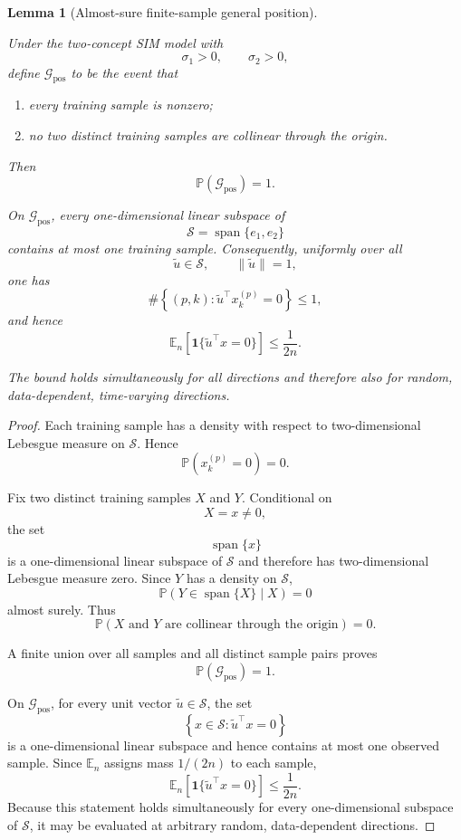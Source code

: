 \documentclass{article} %
\theoremstyle{plain}
\newtheorem{lemma}[theorem]{Lemma}
\theoremstyle{definition}
\theoremstyle{remark}
\begin{document}
\begin{lemma}[Almost-sure finite-sample general position]
\label{lem:general-position}

Under the two-concept SIM model with
\[
\sigma_1>0,
\qquad
\sigma_2>0,
\]
define $\mathcal G_{\mathrm{pos}}$ to be the event that

\begin{enumerate}[label=(\roman*),leftmargin=2em]
\item every training sample is nonzero;
\item no two distinct training samples are collinear through the origin.
\end{enumerate}

Then
\[
\boxed{
\mathbb P(\mathcal G_{\mathrm{pos}})=1.
}
\]

On $\mathcal G_{\mathrm{pos}}$, every one-dimensional linear subspace of
\[
\mathcal S=\operatorname{span}\{e_1,e_2\}
\]
contains at most one training sample. Consequently, uniformly over all
\[
\widetilde u\in\mathcal S,
\qquad
\|\widetilde u\|=1,
\]
one has
\[
\#\left\{
(p,k):
\widetilde u^\top x_k^{(p)}=0
\right\}
\le1,
\]
and hence
\[
\boxed{
\mathbb E_n
\left[
\mathbf 1
\{
\widetilde u^\top x=0
\}
\right]
\le
\frac1{2n}.
}
\]

The bound holds simultaneously for all directions and therefore also for
random, data-dependent, time-varying directions.
\end{lemma}

\begin{proof}
Each training sample has a density with respect to two-dimensional Lebesgue
measure on $\mathcal S$. Hence
\[
\mathbb P
\left(
x_k^{(p)}=0
\right)
=
0.
\]

Fix two distinct training samples $X$ and $Y$. Conditional on
\[
X=x\neq0,
\]
the set
\[
\operatorname{span}\{x\}
\]
is a one-dimensional linear subspace of $\mathcal S$ and therefore has
two-dimensional Lebesgue measure zero. Since $Y$ has a density on
$\mathcal S$,
\[
\mathbb P
\left(
Y\in\operatorname{span}\{X\}
\mid X
\right)
=
0
\]
almost surely. Thus
\[
\mathbb P
\left(
X
\text{ and }
Y
\text{ are collinear through the origin}
\right)
=
0.
\]

A finite union over all samples and all distinct sample pairs proves
\[
\mathbb P(\mathcal G_{\mathrm{pos}})=1.
\]

On $\mathcal G_{\mathrm{pos}}$, for every unit vector
$\widetilde u\in\mathcal S$, the set
\[
\left\{
x\in\mathcal S:
\widetilde u^\top x=0
\right\}
\]
is a one-dimensional linear subspace and hence contains at most one observed
sample. Since $\mathbb E_n$ assigns mass $1/(2n)$ to each sample,
\[
\mathbb E_n
\left[
\mathbf 1
\{
\widetilde u^\top x=0
\}
\right]
\le
\frac1{2n}.
\]
Because this statement holds simultaneously for every one-dimensional
subspace of $\mathcal S$, it may be evaluated at arbitrary random,
data-dependent directions.
\end{proof}
\end{document}
